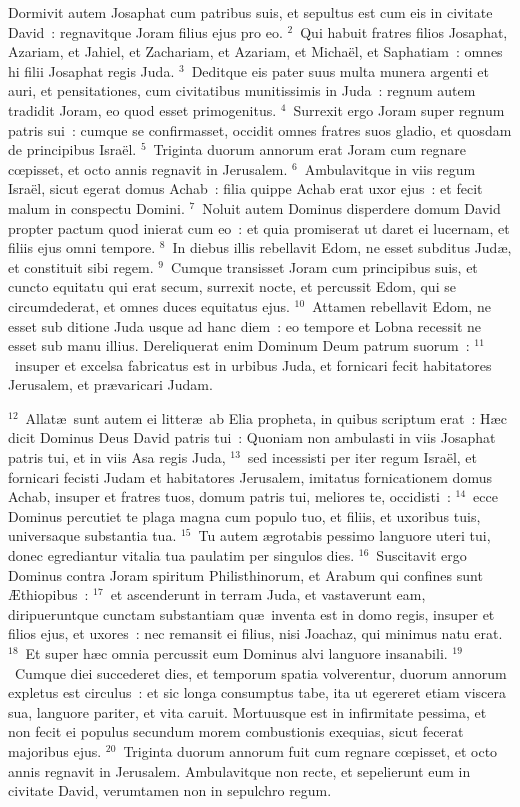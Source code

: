 \lettrine[lines=10,image=true,loversize=0.05,lraise=-0.03]{D}{}ormivit autem Josaphat cum patribus suis, et sepultus est cum eis in civitate David~: regnavitque Joram filius ejus pro eo.
${}^{2}$~Qui habuit fratres filios Josaphat, Azariam, et Jahiel, et Zachariam, et Azariam, et Micha\"el, et Saphatiam~: omnes hi filii Josaphat regis Juda.
${}^{3}$~Deditque eis pater suus multa munera argenti et auri, et pensitationes, cum civitatibus munitissimis in Juda~: regnum autem tradidit Joram, eo quod esset primogenitus.
${}^{4}$~Surrexit ergo Joram super regnum patris sui~: cumque se confirmasset, occidit omnes fratres suos gladio, et quosdam de principibus Isra\"el.
${}^{5}$~Triginta duorum annorum erat Joram cum regnare cœpisset, et octo annis regnavit in Jerusalem.
${}^{6}$~Ambulavitque in viis regum Isra\"el, sicut egerat domus Achab~: filia quippe Achab erat uxor ejus~: et fecit malum in conspectu Domini.
${}^{7}$~Noluit autem Dominus disperdere domum David propter pactum quod inierat cum eo~: et quia promiserat ut daret ei lucernam, et filiis ejus omni tempore.
${}^{8}$~In diebus illis rebellavit Edom, ne esset subditus Jud\ae , et constituit sibi regem.
${}^{9}$~Cumque transisset Joram cum principibus suis, et cuncto equitatu qui erat secum, surrexit nocte, et percussit Edom, qui se circumdederat, et omnes duces equitatus ejus.
${}^{10}$~Attamen rebellavit Edom, ne esset sub ditione Juda usque ad hanc diem~: eo tempore et Lobna recessit ne esset sub manu illius. Dereliquerat enim Dominum Deum patrum suorum~:
${}^{11}$~insuper et excelsa fabricatus est in urbibus Juda, et fornicari fecit habitatores Jerusalem, et pr\ae varicari Judam.


${}^{12}$~Allat\ae\ sunt autem ei litter\ae\ ab Elia propheta, in quibus scriptum erat~: H\ae c dicit Dominus Deus David patris tui~: Quoniam non ambulasti in viis Josaphat patris tui, et in viis Asa regis Juda,
${}^{13}$~sed incessisti per iter regum Isra\"el, et fornicari fecisti Judam et habitatores Jerusalem, imitatus fornicationem domus Achab, insuper et fratres tuos, domum patris tui, meliores te, occidisti~:
${}^{14}$~ecce Dominus percutiet te plaga magna cum populo tuo, et filiis, et uxoribus tuis, universaque substantia tua.
${}^{15}$~Tu autem \ae grotabis pessimo languore uteri tui, donec egrediantur vitalia tua paulatim per singulos dies.
${}^{16}$~Suscitavit ergo Dominus contra Joram spiritum Philisthinorum, et Arabum qui confines sunt \AE thiopibus~:
${}^{17}$~et ascenderunt in terram Juda, et vastaverunt eam, diripueruntque cunctam substantiam qu\ae\ inventa est in domo regis, insuper et filios ejus, et uxores~: nec remansit ei filius, nisi Joachaz, qui minimus natu erat.
${}^{18}$~Et super h\ae c omnia percussit eum Dominus alvi languore insanabili.
${}^{19}$~Cumque diei succederet dies, et temporum spatia volverentur, duorum annorum expletus est circulus~: et sic longa consumptus tabe, ita ut egereret etiam viscera sua, languore pariter, et vita caruit. Mortuusque est in infirmitate pessima, et non fecit ei populus secundum morem combustionis exequias, sicut fecerat majoribus ejus.
${}^{20}$~Triginta duorum annorum fuit cum regnare cœpisset, et octo annis regnavit in Jerusalem. Ambulavitque non recte, et sepelierunt eum in civitate David, verumtamen non in sepulchro regum.


